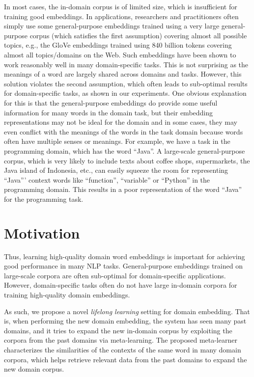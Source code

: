 In most cases, the in-domain corpus is of limited size, which is insufficient for training good embeddings. 
In applications, researchers and practitioners often simply use some general-purpose embeddings trained using a very large general-purpose corpus (which satisfies the first assumption) covering almost all possible topics, e.g., the GloVe embeddings \cite{pennington2014glove} trained using 840 billion tokens covering almost all topics/domains on the Web. Such embeddings have been shown to work reasonably well in many domain-specific tasks. This is not surprising as the meanings of a word are largely shared across domains and tasks. However, this solution violates the second assumption, which often leads to sub-optimal results for domain-specific tasks, as shown in our experiments.
One obvious explanation for this is that the general-purpose embeddings do provide some useful information for many words in the domain task, but their embedding representations may not be ideal for the domain and in some cases, they may even conflict with the meanings of the words in the task domain because words often have multiple senses or meanings.
For example, we have a task in the programming domain, which has the word ``Java''. A large-scale general-purpose corpus, which is very likely to include texts about coffee shops, supermarkets, the Java island of Indonesia, etc., can easily squeeze the room for representing ``Java''' context words like ``function'', ``variable'' or ``Python'' in the programming domain.
This results in a poor representation of the word ``Java'' for the programming task.  

\section{Motivation}
\label{chap3:sec:intro}

Thus, learning high-quality domain word embeddings is important for achieving good performance in many NLP tasks. General-purpose embeddings trained on large-scale corpora are often sub-optimal for domain-specific applications. However, domain-specific tasks often do not have large in-domain corpora for training high-quality domain embeddings.

As such, we propose a novel \textit{lifelong learning} setting for domain embedding. That is, when performing the new domain embedding, the system has seen many past domains, and it tries to expand the new in-domain corpus by exploiting the corpora from the past domains via meta-learning. The proposed meta-learner characterizes the similarities of the contexts of the same word in many domain corpora, which helps retrieve relevant data from the past domains to expand the new domain corpus. 

